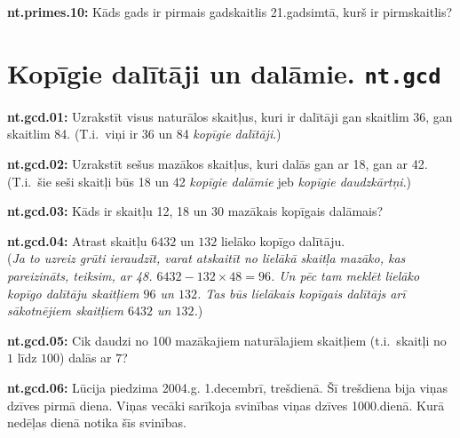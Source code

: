 \documentclass[11pt]{article}
\newenvironment{uzdevums}[1][\unskip]{%
\vspace{3mm}
\noindent
\textbf{#1:}
\noindent}
{}
\begin{document}
\begin{uzdevums}[nt.primes.10]
Kāds gads ir pirmais gadskaitlis 21.gadsimtā, kurš ir pirmskaitlis? 
\end{uzdevums}




\section{Kopīgie dalītāji un dalāmie. \texttt{nt.gcd}}


\begin{uzdevums}[nt.gcd.01]
Uzrakstīt visus naturālos skaitļus, kuri ir dalītāji gan skaitlim 36, gan skaitlim 84. 
(T.i.\ viņi ir 36 un 84 {\em kopīgie dalītāji}.)
\end{uzdevums}

\begin{uzdevums}[nt.gcd.02]
Uzrakstīt sešus mazākos skaitļus, kuri dalās gan ar 18, gan ar 42. (T.i.\ šie seši skaitļi 
būs 18 un 42 {\em kopīgie dalāmie} jeb {\em kopīgie daudzkārtņi}.)
\end{uzdevums}

\begin{uzdevums}[nt.gcd.03]
Kāds ir skaitļu 12, 18 un 30 mazākais kopīgais dalāmais?
\end{uzdevums}

\begin{uzdevums}[nt.gcd.04]
Atrast skaitļu  $6432$ un $132$ lielāko kopīgo dalītāju. \\
({\em Ja to uzreiz grūti ieraudzīt, 
varat atskaitīt no lielākā skaitļa mazāko, kas pareizināts, teiksim, ar 48.
$6432 - 132\times 48 = 96$. Un pēc tam meklēt lielāko kopīgo dalītāju 
skaitļiem $96$ un $132$. Tas būs lielākais kopīgais dalītājs arī sākotnējiem
skaitļiem $6432$ un $132$.})
\end{uzdevums}

\begin{uzdevums}[nt.gcd.05]
Cik daudzi no 100 mazākajiem naturālajiem skaitļiem (t.i.\ skaitļi no $1$ līdz $100$)
dalās ar $7$?
\end{uzdevums}


\begin{uzdevums}[nt.gcd.06]
Lūcija piedzima 2004.g. 1.decembrī, trešdienā. Šī trešdiena bija viņas dzīves pirmā diena. Viņas vecāki 
sarīkoja svinības viņas dzīves 1000.dienā. Kurā nedēļas dienā notika šīs svinības. 
\end{uzdevums}
\end{document}
